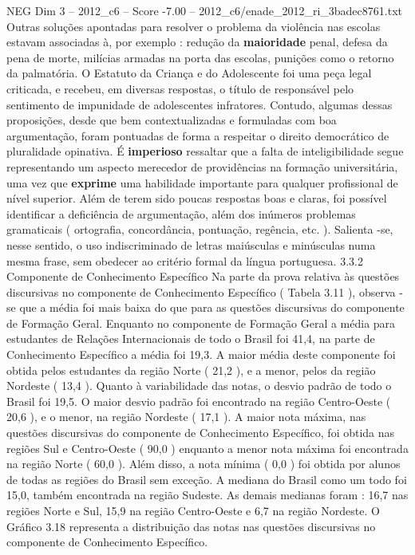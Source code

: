 \begin{textsample}{NEG Dim 3 – 2012\_c6 – Score -7.00 – 2012\_c6/enade\_2012\_ri\_3badec8761.txt}
Outras soluções apontadas para resolver o problema da violência nas escolas estavam associadas à, por exemplo : redução da \textbf{maioridade} penal, defesa da pena de morte, milícias armadas na porta das escolas, punições como o retorno da palmatória.
O Estatuto da Criança e do Adolescente foi uma peça legal criticada, e recebeu, em diversas respostas, o título de responsável pelo sentimento de impunidade de adolescentes infratores.
Contudo, algumas dessas proposições, desde que bem contextualizadas e formuladas com boa argumentação, foram pontuadas de forma a respeitar o direito democrático de pluralidade opinativa.
É \textbf{imperioso} ressaltar que a falta de inteligibilidade segue representando um aspecto merecedor de providências na formação universitária, uma vez que \textbf{exprime} uma habilidade importante para qualquer profissional de nível superior.
Além de terem sido poucas respostas boas e claras, foi possível identificar a deficiência de argumentação, além dos inúmeros problemas gramaticais ( ortografia, concordância, pontuação, regência, etc. ).
Salienta -se, nesse sentido, o uso indiscriminado de letras maiúsculas e minúsculas numa mesma frase, sem obedecer ao critério formal da língua portuguesa. 3.3.2 Componente de Conhecimento Específico Na parte da prova relativa às questões discursivas no componente de Conhecimento Específico ( Tabela 3.11 ), observa -se que a média foi mais baixa do que para as questões discursivas do componente de Formação Geral.
Enquanto no componente de Formação Geral a média para estudantes de Relações Internacionais de todo o Brasil foi 41,4, na parte de Conhecimento Específico a média foi 19,3.
A maior média deste componente foi obtida pelos estudantes da região Norte ( 21,2 ), e a menor, pelos da região Nordeste ( 13,4 ).
Quanto à variabilidade das notas, o desvio padrão de todo o Brasil foi 19,5.
O maior desvio padrão foi encontrado na região Centro-Oeste ( 20,6 ), e o menor, na região Nordeste ( 17,1 ).
A maior nota máxima, nas questões discursivas do componente de Conhecimento Específico, foi obtida nas regiões Sul e Centro-Oeste ( 90,0 ) enquanto a menor nota máxima foi encontrada na região Norte ( 60,0 ).
Além disso, a nota mínima ( 0,0 ) foi obtida por alunos de todas as regiões do Brasil sem exceção.
A mediana do Brasil como um todo foi 15,0, também encontrada na região Sudeste.
As demais medianas foram : 16,7 nas regiões Norte e Sul, 15,9 na região Centro-Oeste e 6,7 na região Nordeste.
O Gráfico 3.18 representa a distribuição das notas nas questões discursivas no componente de Conhecimento Específico.

\end{textsample}

